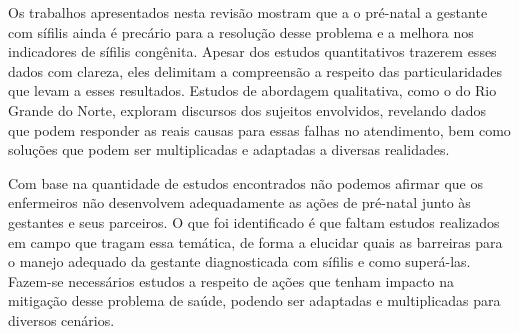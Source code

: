 Os trabalhos apresentados nesta revisão mostram que a o pré-natal a gestante com sífilis ainda é precário para a resolução desse problema e a melhora nos indicadores de sífilis congênita. Apesar dos estudos quantitativos trazerem esses dados com clareza, eles delimitam a compreensão a respeito das particularidades que levam a esses resultados. Estudos de abordagem qualitativa, como o do Rio Grande do Norte, exploram discursos dos sujeitos envolvidos, revelando dados que podem responder as reais causas para essas falhas no atendimento, bem como soluções que podem ser multiplicadas e adaptadas a diversas realidades.  

Com base na quantidade de estudos encontrados não podemos afirmar que os enfermeiros não desenvolvem adequadamente as ações de pré-natal junto às gestantes e seus parceiros. O que foi identificado é que faltam estudos realizados em campo que tragam essa temática, de forma a elucidar quais as barreiras para o manejo adequado da gestante diagnosticada com sífilis e como superá-las. Fazem-se necessários estudos  a respeito de ações que tenham impacto na mitigação desse problema de saúde, podendo ser adaptadas e multiplicadas para diversos cenários. 

